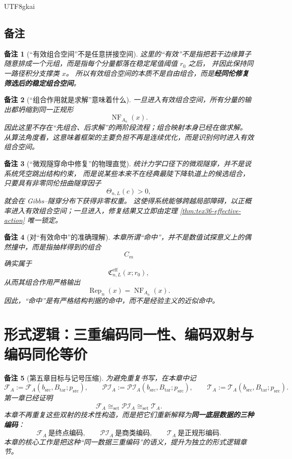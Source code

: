 \documentclass[12pt]{article}
\newtheorem{remark}{备注}[section]
\newcommand{\NF}{\operatorname{NF}}
\begin{document}
\begin{CJK*}{UTF8}{gkai}
\subsection{备注}
\label{subsec:tex36-ch4-remarks}

\begin{remark}[“有效组合空间”不是任意拼接空间]
这里的“有效”不是指把若干边缘算子随意排成一个元组，而是指每个分量都落在稳定尾值阈值 $r_0$ 之后，
并因此保持同一路径积分支撑类 $x$。
所以有效组合空间的本质不是自由组合，而是\textbf{经同伦修复筛选后的稳定组合空间}。
\end{remark}

\begin{remark}[“组合作用就是求解”意味着什么]
一旦进入有效组合空间，所有分量的输出都坍缩到同一正规形
\[
  \NF_{A_n}(x).
\]
因此这里不存在“先组合、后求解”的两阶段流程；组合映射本身已经在做求解。
从算法角度看，这意味着框架的主要负担不再是连续优化，而是识别何时进入有效组合空间。
\end{remark}

\begin{remark}[“微观隧穿命中修复”的物理直觉]
统计力学口径下的微观隧穿，并不是说系统凭空跳出结构约束，
而是说某些本来不在经典最陡下降轨道上的候选组合，只要具有非零同伦扭曲隧穿因子
\[
  \Theta_{n,L}(c)>0,
\]
就会在 Gibbs--隧穿分布下获得非零权重。
这使得系统能够跨越局部障碍，以正概率进入有效组合空间；一旦进入，修复结果又立即由定理 \ref{thm:tex36-effective-action} 唯一锁定。
\end{remark}

\begin{remark}[对“有效命中”的准确理解]
本章所谓“命中”，并不是数值试探意义上的偶然撞中，而是指抽样得到的组合
\[
  C_m
\]
确实属于
\[
  \mathfrak C_{n,L}^{\mathrm{eff}}(x;r_0),
\]
从而其组合作用严格输出
\[
  \operatorname{Rep}_n(x)=\NF_{A_n}(x).
\]
因此，“命中”是有严格结构判据的命中，而不是经验主义的近似命中。
\end{remark}

\clearpage
\section{形式逻辑：三重编码同一性、编码双射与编码同伦等价}
\label{sec:tex36-ch5}

\begin{remark}[第五章目标与记号压缩]
为避免重复书写，在本章中记
\[
  \mathcal F_A
  :=
  \mathcal{F}_{A}(b_{\mathrm{src}},B_{\mathrm{tar}};p_{\mathrm{src}}),
  \qquad
  \mathcal{PI}_A
  :=
  \mathcal{PI}_{A}(b_{\mathrm{src}},B_{\mathrm{tar}};p_{\mathrm{src}}),
  \qquad
  \mathcal T_A
  :=
  \mathcal{T}_{A}(b_{\mathrm{src}},B_{\mathrm{tar}};p_{\mathrm{src}}).
\]
第一章已经证明
\[
  \mathcal F_A\cong_{\mathrm{set}}\mathcal{PI}_A\cong_{\mathrm{set}}\mathcal T_A.
\]
本章不再重复这些双射的技术性构造，而是把它们重新解释为\textbf{同一底层数据的三种编码}：
\[
  \mathcal F_A \ \text{是终点编码},\qquad
  \mathcal{PI}_A \ \text{是商类编码},\qquad
  \mathcal T_A \ \text{是正规形编码}.
\]
本章的核心工作是把这种“同一数据三重编码”的语义，提升为独立的形式逻辑章节。
\end{remark}


\end{CJK*}
\end{document}
